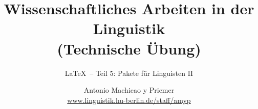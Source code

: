 


\title{
	Wissenschaftliches Arbeiten in der Linguistik\\
	(Technische Übung)
}

\subtitle{\LaTeX\ -- Teil 5: Pakete für Linguisten II}

\author[aMyP]{
	{\small Antonio Machicao y Priemer}
	\\
	{\footnotesize \url{www.linguistik.hu-berlin.de/staff/amyp}}
}


\date{ }






\begin{frame}
  \HUtitle
\end{frame}





\nocite{Freitag&MyP15a}
\nocite{Knuth1986}
\nocite{Kopka94a}
\nocite{MyP17c}
\nocite{MyP&Kerkhof16a}
	



